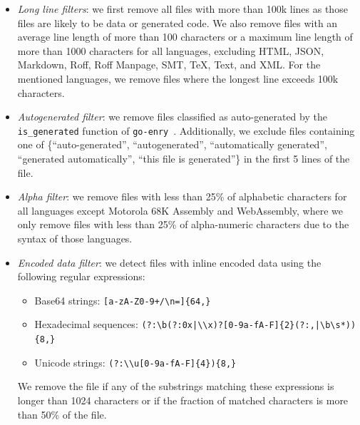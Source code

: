 \documentclass[10pt]{article} %
\begin{document}
\begin{itemize}
    \item \emph{Long line filters}: we first remove all files with more than 100k lines as those files are likely to be data or generated code. We also remove files with an average line length of more than 100 characters or a maximum line length of more than 1000 characters for all languages, excluding HTML, JSON, Markdown, Roff, Roff Manpage, SMT, TeX, Text, and XML. For the mentioned languages, we remove files where the longest line exceeds 100k characters. 
    \item \emph{Autogenerated filter}: we remove files classified as auto-generated by the \verb|is_generated| function of \verb|go-enry|~\citep{go_enry}. Additionally, we exclude files containing one of \{``auto-generated'', ``autogenerated'', ``automatically generated'', ``generated automatically'', ``this file is generated''\} in the first 5 lines of the file. 
    \item \emph{Alpha filter}: we remove files with less than 25\% of alphabetic characters for all languages except Motorola 68K Assembly and WebAssembly, where we only remove files with less than 25\% of alpha-numeric characters due to the syntax of those languages. 
    \item \emph{Encoded data filter}: we detect files with inline encoded data using the following regular expressions:
    \begin{itemize}
        \item Base64 strings: \verb|[a-zA-Z0-9+/\n=]{64,}|
        \item Hexadecimal sequences: \verb$(?:\b(?:0x|\\x)?[0-9a-fA-F]{2}(?:,|\b\s*)){8,}$
        \item Unicode strings: \verb|(?:\\u[0-9a-fA-F]{4}){8,}|
    \end{itemize}
    We remove the file if any of the substrings matching these expressions is longer than 1024 characters or if the fraction of matched characters is more than 50\% of the file.
\end{itemize}
\end{document}
